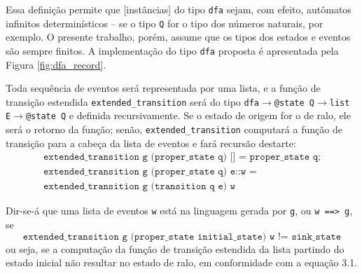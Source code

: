 Essa definição permite que [instâncias] do tipo \texttt{dfa} sejam, com efeito, autômatos infinitos determinísticos -- se o tipo \texttt{Q} for o tipo dos números naturais, por exemplo. O presente trabalho, porém, assume que os tipos dos estados e eventos são sempre finitos. A implementação do tipo \texttt{dfa} proposta é apresentada pela Figura \ref{fig:dfa_record}.


Toda sequência de eventos será representada por uma lista, e a função de transição estendida \texttt{extended\_transition} será do tipo \texttt{dfa$\rightarrow$@state Q$\rightarrow$list E$\rightarrow$@state Q} e definida recursivamente. Se o estado de origem for o de ralo, ele será o retorno da função; senão, \texttt{extended\_transition} computará a função de transição para a cabeça da lista de eventos e fará recursão destarte: \begin{gather*}
\texttt{extended\_transition g (proper\_state q) [] = proper\_state q;}\\\texttt{extended\_transition g (proper\_state q) e::w =}\\\texttt{extended\_transition g (transition q e) w}\end{gather*}

Dir-se-á que uma lista de eventos \texttt{w} está na linguagem gerada por \texttt{g}, ou \texttt{w ==> g}, se $$\texttt{extended\_transition g (proper\_state initial\_state) w != sink\_state}$$ ou seja, se a computação da função de transição estendida da lista partindo do estado inicial não resultar no estado de ralo, em conformidade com a equação 3.1.